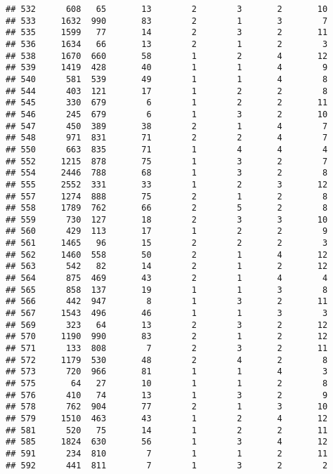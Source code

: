 \documentclass[]{article}
\begin{document}
\begin{verbatim}
## 532      608   65       13        2        3       2       10
## 533     1632  990       83        2        1       3        7
## 535     1599   77       14        2        3       2       11
## 536     1634   66       13        2        1       2        3
## 538     1670  660       58        1        2       4       12
## 539     1419  428       40        1        1       4        9
## 540      581  539       49        1        1       4        8
## 544      403  121       17        1        2       2        8
## 545      330  679        6        1        2       2       11
## 546      245  679        6        1        3       2       10
## 547      450  389       38        2        1       4        7
## 548      971  831       71        2        2       4        7
## 550      663  835       71        1        4       4        4
## 552     1215  878       75        1        3       2        7
## 554     2446  788       68        1        3       2        8
## 555     2552  331       33        1        2       3       12
## 557     1274  888       75        2        1       2        8
## 558     1789  762       66        2        5       2        8
## 559      730  127       18        2        3       3       10
## 560      429  113       17        1        2       2        9
## 561     1465   96       15        2        2       2        3
## 562     1460  558       50        2        1       4       12
## 563      542   82       14        2        1       2       12
## 564      875  469       43        2        1       4        4
## 565      858  137       19        1        1       3        8
## 566      442  947        8        1        3       2       11
## 567     1543  496       46        1        1       3        3
## 569      323   64       13        2        3       2       12
## 570     1190  990       83        2        1       2       12
## 571      133  808        7        2        3       2       11
## 572     1179  530       48        2        4       2        8
## 573      720  966       81        1        1       4        3
## 575       64   27       10        1        1       2        8
## 576      410   74       13        1        3       2        9
## 578      762  904       77        2        1       3       10
## 579     1510  463       43        1        2       4       12
## 581      520   75       14        1        2       2       11
## 585     1824  630       56        1        3       4       12
## 591      234  810        7        1        1       2       11
## 592      441  811        7        1        3       2        2

\end{verbatim}
\end{document}
